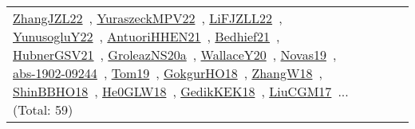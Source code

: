 {\begin{longtable}{lp{3cm}>{\raggedright\arraybackslash}p{6cm}>{\raggedright\arraybackslash}p{6cm}>{\raggedright\arraybackslash}p{8cm}}
\href{works/ZhangJZL22.pdf}{ZhangJZL22}~\cite{ZhangJZL22}, \href{works/YuraszeckMPV22.pdf}{YuraszeckMPV22}~\cite{YuraszeckMPV22}, \href{works/LiFJZLL22.pdf}{LiFJZLL22}~\cite{LiFJZLL22}, \href{works/YunusogluY22.pdf}{YunusogluY22}~\cite{YunusogluY22}, \href{works/AntuoriHHEN21.pdf}{AntuoriHHEN21}~\cite{AntuoriHHEN21}, \href{works/Bedhief21.pdf}{Bedhief21}~\cite{Bedhief21}, \href{works/HubnerGSV21.pdf}{HubnerGSV21}~\cite{HubnerGSV21}, \href{works/GroleazNS20a.pdf}{GroleazNS20a}~\cite{GroleazNS20a}, \href{works/WallaceY20.pdf}{WallaceY20}~\cite{WallaceY20}, \href{works/Novas19.pdf}{Novas19}~\cite{Novas19}, \href{works/abs-1902-09244.pdf}{abs-1902-09244}~\cite{abs-1902-09244}, \href{works/Tom19.pdf}{Tom19}~\cite{Tom19}, \href{works/GokgurHO18.pdf}{GokgurHO18}~\cite{GokgurHO18}, \href{works/ZhangW18.pdf}{ZhangW18}~\cite{ZhangW18}, \href{works/ShinBBHO18.pdf}{ShinBBHO18}~\cite{ShinBBHO18}, \href{works/He0GLW18.pdf}{He0GLW18}~\cite{He0GLW18}, \href{works/GedikKEK18.pdf}{GedikKEK18}~\cite{GedikKEK18}, \href{works/LiuCGM17.pdf}{LiuCGM17}~\cite{LiuCGM17}... (Total: 59)\\
\end{longtable}
}


